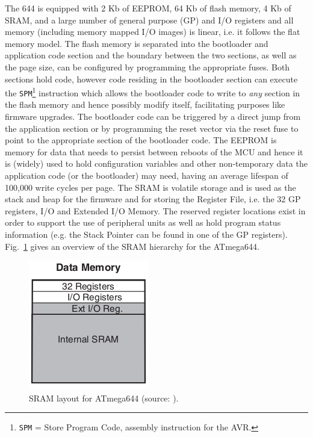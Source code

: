 	The 644 is equipped with 2 Kb of EEPROM, 64 Kb of flash memory, 4 Kb of SRAM, and a large number of general purpose (GP) and I/O registers and all memory (including memory mapped I/O images) is linear, i.e. it follows the flat memory model. The flash memory is separated into the bootloader and application code section and the boundary between the two sections, as well as the page size, can be configured by programming the appropriate fuses. Both sections hold code, however code residing in the bootloader section can execute the \texttt{SPM}\footnote{\texttt{SPM} = Store Program Code, assembly instruction for the AVR.} instruction which allows the bootloader code to write to \textit{any} section in the flash memory and hence possibly modify itself, facilitating purposes like firmware upgrades. The bootloader code can be triggered by a direct jump from the application section or by programming the reset vector via the reset fuse to point to the appropriate section of the bootloader code. The EEPROM is memory for data that needs to persist between reboots of the MCU and hence it is (widely) used to hold configuration variables and other non-temporary data the application code (or the bootloader) may need, having an average lifespan of 100,000 write cycles per page. The SRAM is volatile storage and is used as the stack and heap for the firmware and for storing the Register File, i.e. the 32 GP registers, I/O and Extended I/O Memory. The reserved register locations exist in order to support the use of peripheral units as well as hold program status information (e.g. the Stack Pointer can be found in one of the GP registers). Fig.~\ref{fig:stack} gives an overview of the SRAM hierarchy for the ATmega644.
	
	\begin{figure}
		\center
		\includegraphics[scale=0.7]{img/stack.png}
		\caption{\footnotesize SRAM layout for ATmega644 (source: \protect\citep{atmega_manual}).}
		\label{fig:stack}		
	\end{figure}

